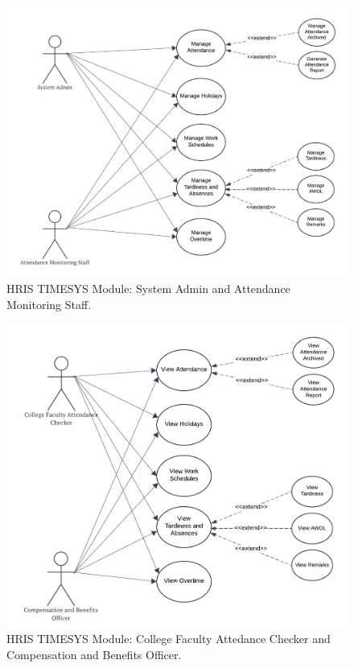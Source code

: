     \begin{figure}[H]
        \centering
        \includegraphics[width=0.9\linewidth]{figures/images/use-case-time-1.png}
        \caption{HRIS TIMESYS Module: System Admin and Attendance Monitoring Staff.}
        \label{fig:use-case-time-1}
    \end{figure}

    \begin{figure}[H]
        \centering
        \includegraphics[width=0.9\linewidth]{figures/images/use-case-time-2.png}
        \caption{HRIS TIMESYS Module: College Faculty Attedance Checker and Compensation and Benefits Officer.}
        \label{fig:use-case-time-2}
    \end{figure}

